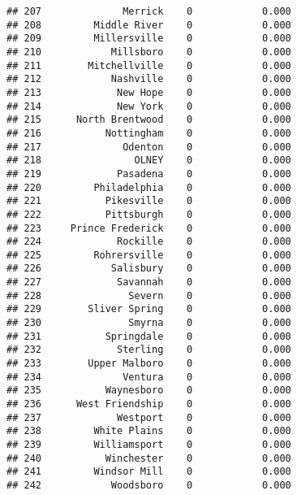 \documentclass[]{article}
\newenvironment{Shaded}{\begin{snugshade}}{\end{snugshade}}
\newcommand{\KeywordTok}[1]{\textcolor[rgb]{0.13,0.29,0.53}{\textbf{#1}}}
\newcommand{\DataTypeTok}[1]{\textcolor[rgb]{0.13,0.29,0.53}{#1}}
\newcommand{\DecValTok}[1]{\textcolor[rgb]{0.00,0.00,0.81}{#1}}
\newcommand{\StringTok}[1]{\textcolor[rgb]{0.31,0.60,0.02}{#1}}
\newcommand{\OperatorTok}[1]{\textcolor[rgb]{0.81,0.36,0.00}{\textbf{#1}}}
\newcommand{\NormalTok}[1]{#1}
\begin{document}
\begin{verbatim}
## 207              Merrick    0            0.000
## 208         Middle River    0            0.000
## 209         Millersville    0            0.000
## 210            Millsboro    0            0.000
## 211        Mitchellville    0            0.000
## 212            Nashville    0            0.000
## 213             New Hope    0            0.000
## 214             New York    0            0.000
## 215      North Brentwood    0            0.000
## 216           Nottingham    0            0.000
## 217              Odenton    0            0.000
## 218                OLNEY    0            0.000
## 219             Pasadena    0            0.000
## 220         Philadelphia    0            0.000
## 221           Pikesville    0            0.000
## 222           Pittsburgh    0            0.000
## 223     Prince Frederick    0            0.000
## 224             Rockille    0            0.000
## 225         Rohrersville    0            0.000
## 226            Salisbury    0            0.000
## 227             Savannah    0            0.000
## 228               Severn    0            0.000
## 229        Sliver Spring    0            0.000
## 230               Smyrna    0            0.000
## 231           Springdale    0            0.000
## 232             Sterling    0            0.000
## 233        Upper Malboro    0            0.000
## 234              Ventura    0            0.000
## 235           Waynesboro    0            0.000
## 236      West Friendship    0            0.000
## 237             Westport    0            0.000
## 238         White Plains    0            0.000
## 239         Williamsport    0            0.000
## 240           Winchester    0            0.000
## 241         Windsor Mill    0            0.000
## 242            Woodsboro    0            0.000
\end{verbatim}

\begin{Shaded}
\end{Shaded}
\end{document}
